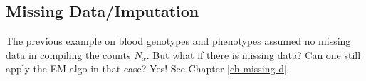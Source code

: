 \subsection{Missing
 Data/Imputation}

The previous example
on blood genotypes and phenotypes
assumed no missing
data in compiling the
counts $N_x$. 
But what if there is missing
data? Can one
still apply
the EM algo in that case?
Yes! See Chapter \ref{ch-missing-d}.


